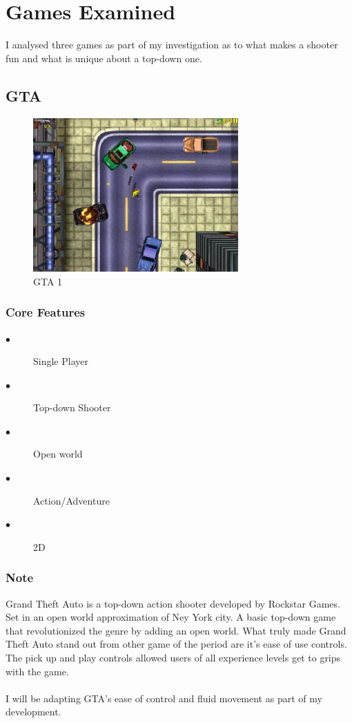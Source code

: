 \documentclass[a4paper]{scrreprt}
\begin{document}
\section{Games Examined}

I analysed three games as part of my investigation as to what makes a shooter fun and what is unique about a top-down one.

\subsection{GTA}

\begin{figure}[H]
\centering
\includegraphics[width=0.70\textwidth]{gta1.jpg}
\caption{\label{fig:art} GTA 1}
\end{figure}

\subsubsection{Core Features}
\begin{description}
\item[$\bullet$] Single Player
\item[$\bullet$] Top-down Shooter
\item[$\bullet$] Open world
\item[$\bullet$] Action/Adventure
\item[$\bullet$] 2D
\end{description}

\subsubsection{Note}
Grand Theft Auto is a top-down action shooter developed by Rockstar Games. Set in an open world approximation of Ney York city.
A basic top-down game that revolutionized the genre by adding an open world.
What truly made Grand Theft Auto stand out from other game of the period are it's ease of use controls. 
The pick up and play controls allowed users of all experience levels get to grips with the game. \\\\
I will be adapting GTA's ease of control and fluid movement as part of my development.
\end{document}
